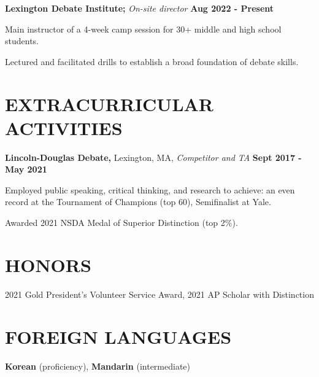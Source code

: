 \documentclass[11pt]{article}
\begin{document}
\raggedright
\textbf{Lexington Debate Institute;} \textit{On-site director} \hfill \textbf{Aug 2022 - Present} 
\begin{sublist}
	\item Main instructor of a 4-week camp session for 30+ middle and high school students. 
	\item Lectured and facilitated drills to establish a broad foundation of debate skills.
\end{sublist}

\section*{EXTRACURRICULAR ACTIVITIES}
\textbf{Lincoln-Douglas Debate,} Lexington, MA, \textit{Competitor and TA} \hfill \textbf{Sept 2017 - May 2021}
\begin{sublist}
  \item Employed public speaking, critical thinking, and research to achieve: an even record at the Tournament of Champions (top 60), Semifinalist at Yale.
  \item Awarded 2021 NSDA Medal of Superior Distinction (top 2\%).
\end{sublist}

\section*{HONORS}
2021 Gold President’s Volunteer Service Award, 2021 AP Scholar with Distinction

\section*{FOREIGN LANGUAGES}
\textbf{Korean} (proficiency), \textbf{Mandarin} (intermediate)
\end{document}
